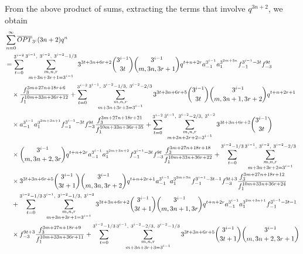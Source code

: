 \documentclass[12pt,reqno]{amsart}
\numberwithin{equation}{section}
\begin{document}
    \iffalse
    From the above product of sums, extracting the terms that involve $q^{3n+2}$, we obtain
    \begin{align*}
         &\sum_{n=0}^\infty \overline{OPT}_{3^i}(3n+2)q^{n}\notag\\
         &=\sum_{t=0}^{3^{i-2}}\sum_{\substack{m,n,r\\m+3n+3r+1=3^{i-1}}}^{3^{i-1},~ 3^{i-2},~ 3^{i-2}-1/3} 3^{3t+3n+6r+2}\binom{3^{i-1}}{3t}\binom{3^{i-1}}{m,3n,3r+1}q^{t+n+2r}a_{-1}^{3^{i-1}} a_{1}^{3^{2m+3n}}f_{-1}^{3^{i-1}-3t}f_{-3}^{9t}\notag\\
         &\quad \times \dfrac{f_3^{3m+27n+18r+6}}{f_1^{10m+33n+36r+12}}+ \sum_{t=0}^{3^{i-2}} \sum_{\substack{m,n,r\\m+3n+3r+3=3^{i-1}}}^{3^{i-1},~ 3^{i-2}-1/3,~ 3^{i-2}-2/3} 3^{3t+3n+6r+5}\binom{3^{i-1}}{3t}\binom{3^{i-1}}{m,3n+1,3r+2}q^{t+n+2r+1}\notag\\
         &\quad\times a_{-1}^{3^{i-1}} a_{1}^{3^{2m+3n+1}}f_{-1}^{3^{i-1}-3t}f_{-3}^{9t}\dfrac{f_3^{3m+27n+18r+21}}{f_1^{10m+33n+36r+35}} 
         + \sum_{t=0}^{3^{i-2}} \sum_{\substack{m,n,r\\m+3n+3r+2=3^{i-1}}}^{3^{i-1},~ 3^{i-2}-2/3,~ 3^{i-2}} 3^{3t+3n+6r+2}\binom{3^{i-1}}{3t} \\
         &\quad \times\binom{3^{i-1}}{m,3n+2,3r} q^{t+n+2r}a_{-1}^{3^{i-1}}  a_{1}^{3^{2m+3n+2}}f_{-1}^{3^{i-1}-3t}f_{-3}^{9t}\dfrac{f_3^{3m+27n+18r+18}}{f_1^{10m+33n+36r+22}}+
         \sum_{t=0}^{3^{i-2}-1/3} \sum_{\substack{m,n,r\\m+3n+3r+2=3^{i-1}}}^{3^{i-1},~ 3^{i-2},~ 3^{i-2}-2/3}\\
         &\quad \times 3^{3t+3n+6r+5} \binom{3^{i-1}}{3t+1} \binom{3^{i-1}}{m,3n,3r+2} q^{t+n+2r+1}a_{-1}^{3^{i-1}}  a_{1}^{3^{2m+3n}}f_{-1}^{3^{i-1}-3t-1}f_{-3}^{9t+3}\dfrac{f_3^{3m+27n+18r+12}}{f_1^{10m+33n+36r+24}}\\
         &\quad +\sum_{t=0}^{3^{i-2}-1/3} \sum_{\substack{m,n,r\\m+3n+3r+1=3^{i-1}}}^{3^{i-1},~ 3^{i-2}-1/3,~ 3^{i-2}} 3^{3t+3n+6r+2}\binom{3^{i-1}}{3t+1}\binom{3^{i-1}}{m,3n+1,3r}q^{t+n+2r}a_{-1}^{3^{i-1}}  a_{1}^{3^{2m+3n+1}}f_{-1}^{3^{i-1}-3t-1}\\
         &\quad \times f_{-3}^{9t+3}\dfrac{f_3^{3m+27n+18r+9}}{f_1^{10m+33n+36r+11}}+\sum_{t=0}^{3^{i-2}-1/3} \sum_{\substack{m,n,r\\m+3n+3r+3=3^{i-1}}}^{3^{i-1},~ 3^{i-2}-2/3,~ 3^{i-2}-1/3} 3^{3t+3n+6r+5}\binom{3^{i-1}}{3t+1} \binom{3^{i-1}}{m,3n+2,3r+1}\\

\end{align*}
\end{document}
